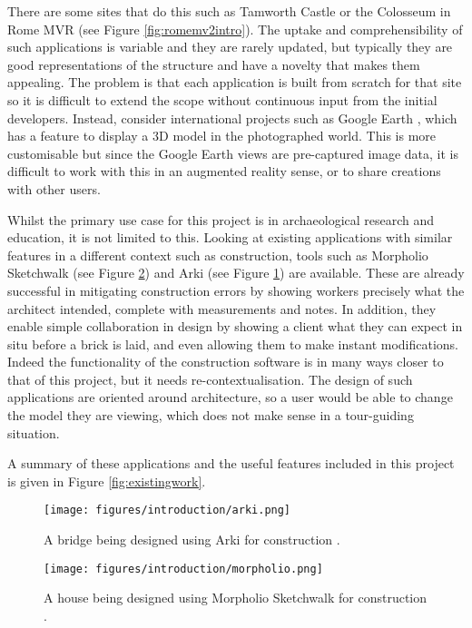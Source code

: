 \documentclass[12pt, a4paper]{article}
\begin{document}
There are some sites that do this such as Tamworth Castle \cite{existing:tamworth} or the Colosseum in Rome MVR \cite{existing:romemvr} \cite{existing:historik} (see Figure \ref{fig:romemv2intro}). The uptake and comprehensibility of such applications is variable and they are rarely updated, but typically they are good representations of the structure and have a novelty that makes them appealing. The problem is that each application is built from scratch for that site so it is difficult to extend the scope without continuous input from the initial developers. Instead, consider international projects such as Google Earth \cite{existing:googleearth}, which has a feature to display a 3D model in the photographed world. This is more customisable but since the Google Earth views are pre-captured image data, it is difficult to work with this in an augmented reality sense, or to share creations with other users.

Whilst the primary use case for this project is in archaeological research and education, it is not limited to this. Looking at existing applications with similar features in a different context such as construction, tools such as Morpholio Sketchwalk \cite{existing:morpholio} (see Figure \ref{fig:morpholio}) and Arki \cite{existing:arki} (see Figure \ref{fig:arki}) are available. These are already successful in mitigating construction errors by showing workers precisely what the architect intended, complete with measurements and notes. In addition, they enable simple collaboration in design \cite{existing:ardesign} by showing a client what they can expect in situ before a brick is laid, and even allowing them to make instant modifications. Indeed the functionality of the construction software is in many ways closer to that of this project, but it needs re-contextualisation. The design of such applications are oriented around architecture, so a user would be able to change the model they are viewing, which does not make sense in a tour-guiding situation.

A summary of these applications and the useful features included in this project is given in Figure \ref{fig:existingwork}.

\begin{figure}[H]
    \centering
    \texttt{[image: figures/introduction/arki.png]}
    \caption{A bridge being designed using Arki for construction \cite{existing:arki}.}
    \label{fig:arki}
\end{figure}

\begin{figure}[H]
    \centering
    \texttt{[image: figures/introduction/morpholio.png]}
    \caption{A house being designed using Morpholio Sketchwalk for construction \cite{existing:morpholio}.}
    \label{fig:morpholio}
\end{figure}
\end{document}
